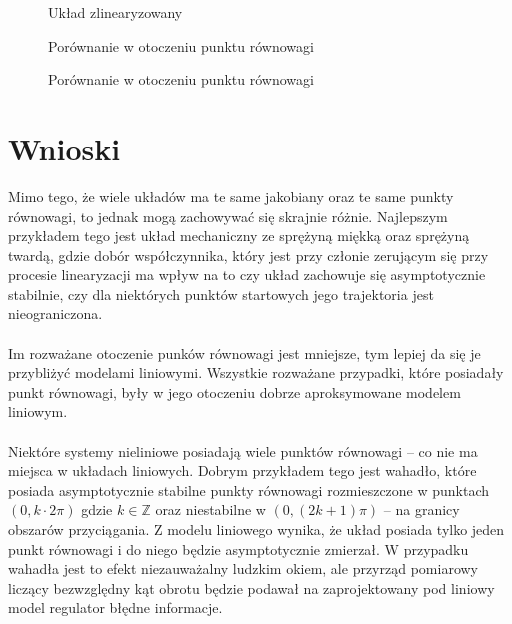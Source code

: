 \documentclass[a4paper, 10pt]{article}
\begin{document}
				\begin{figure}[H]
					\centering
					\def \svgwidth{0.75\columnwidth}
					
					\caption{Układ zlinearyzowany}
				\end{figure}\noindent


				\begin{figure}[H]
					\centering
					\def \svgwidth{0.75\columnwidth}
					\caption{Porównanie w otoczeniu punktu równowagi}
				\end{figure}\noindent


				\begin{figure}[H]
					\centering
					\def \svgwidth{0.75\columnwidth}
					
					\caption{Porównanie w otoczeniu punktu równowagi}
				\end{figure}\noindent


	\section{Wnioski}
		Mimo tego, że wiele układów ma te same jakobiany oraz te same punkty równowagi, to jednak mogą zachowywać się skrajnie różnie. Najlepszym przykładem tego jest układ mechaniczny ze sprężyną miękką oraz sprężyną twardą,
		gdzie dobór współczynnika, który jest przy członie zerującym się przy procesie linearyzacji ma wpływ na to czy układ zachowuje się asymptotycznie stabilnie, czy dla niektórych punktów startowych jego trajektoria jest
		nieograniczona.
		\\ \\
		Im rozważane otoczenie punków równowagi jest mniejsze, tym lepiej da się je przybliżyć modelami liniowymi. Wszystkie rozważane przypadki, które posiadały punkt równowagi, były w jego otoczeniu dobrze aproksymowane
		modelem liniowym.
		\\ \\
		Niektóre systemy nieliniowe posiadają wiele punktów równowagi -- co nie ma miejsca w układach liniowych. Dobrym przykładem tego jest wahadło, które posiada asymptotycznie stabilne punkty równowagi rozmieszczone w punktach
		$(0, k \cdot 2\pi)$ gdzie $k \in \mathbb{Z}$ oraz niestabilne w $(0, (2k + 1)\pi)$ -- na granicy obszarów przyciągania. Z modelu liniowego wynika, że układ posiada tylko jeden punkt równowagi i do niego będzie asymptotycznie
		zmierzał. W przypadku wahadła jest to efekt niezauważalny ludzkim okiem, ale przyrząd pomiarowy liczący bezwzględny kąt obrotu będzie podawał na zaprojektowany pod liniowy model regulator błędne informacje.
\end{document}
